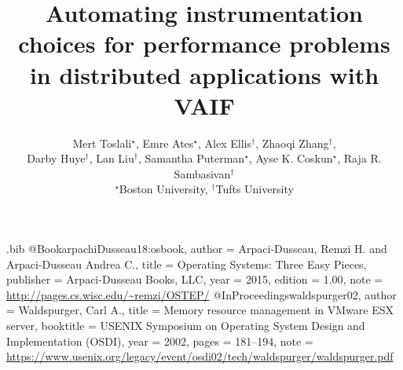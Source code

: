 \usepackage{filecontents}
\usepackage{tikz}
\usepackage{amsmath}
\usepackage{xurl} 
\usepackage{amsfonts}
\usepackage{ifthen}
\usepackage{shadow}
\usepackage{hhline}
\usepackage{tabularx}
\usepackage{fancyhdr}
\usepackage{etoolbox}
\usepackage[T1]{fontenc}
\usepackage{textcomp}
\usepackage{enumitem}
\usepackage{color}
\usepackage{colortbl}
\usepackage{enumitem}
\usepackage{cancel}
\usepackage{bbding}
\usepackage{booktabs}
\usepackage{multirow}
\usepackage{tabularx}
\usepackage{subcaption}
\usepackage{makecell}

\begin{filecontents}{\jobname.bib}
@Book{arpachiDusseau18:osbook,
  author =       {Arpaci-Dusseau, Remzi H. and Arpaci-Dusseau Andrea C.},
  title =        {Operating Systems: Three Easy Pieces},
  publisher =    {Arpaci-Dusseau Books, LLC},
  year =         2015,
  edition =      {1.00},
  note =         {\url{http://pages.cs.wisc.edu/~remzi/OSTEP/}}
}
@InProceedings{waldspurger02,
  author =       {Waldspurger, Carl A.},
  title =        {Memory resource management in {VMware ESX} server},
  booktitle =    {USENIX Symposium on Operating System Design and
                  Implementation (OSDI)},
  year =         2002,
  pages =        {181--194},
  note =         {\url{https://www.usenix.org/legacy/event/osdi02/tech/waldspurger/waldspurger.pdf}}}
\end{filecontents}

\newcommand*\STAIF[0]{VAIF} %
\newcommand*\staif[0]{VAIF} %


\date{}

\title{Automating instrumentation choices for performance problems in distributed applications with VAIF}
\author{Mert Toslali$^{\star}$, Emre Ates$^{\star}$, Alex Ellis$^{\dagger}$, Zhaoqi Zhang$^{\dagger}$, \\
Darby Huye$^{\dagger}$, Lan Liu$^{\dagger}$, Samantha Puterman$^{\star}$, Ayse K. Coskun$^{\star}$, Raja R. Sambasivan$^{\dagger}$
  \\{$^{\star}$Boston University, $^{\dagger}$Tufts University}
}
\maketitle

